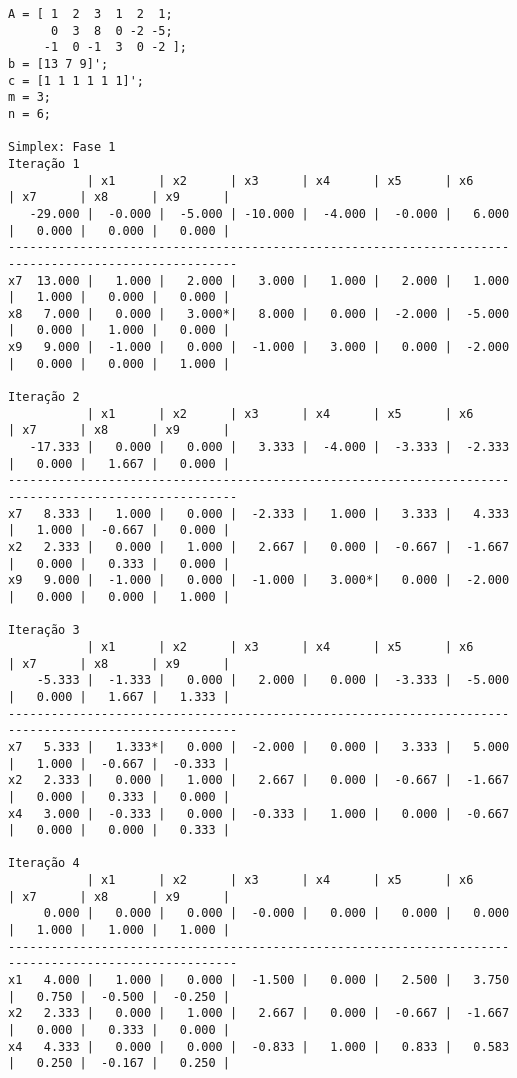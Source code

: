 \documentclass[brazil,times]{abnt}
\begin{document}
{\scriptsize \begin{verbatim}
A = [ 1  2  3  1  2  1;
      0  3  8  0 -2 -5;
     -1  0 -1  3  0 -2 ];
b = [13 7 9]';
c = [1 1 1 1 1 1]';
m = 3;
n = 6;

Simplex: Fase 1
Iteração 1
           | x1      | x2      | x3      | x4      | x5      | x6      | x7      | x8      | x9      |
   -29.000 |  -0.000 |  -5.000 | -10.000 |  -4.000 |  -0.000 |   6.000 |   0.000 |   0.000 |   0.000 |
------------------------------------------------------------------------------------------------------
x7  13.000 |   1.000 |   2.000 |   3.000 |   1.000 |   2.000 |   1.000 |   1.000 |   0.000 |   0.000 |
x8   7.000 |   0.000 |   3.000*|   8.000 |   0.000 |  -2.000 |  -5.000 |   0.000 |   1.000 |   0.000 |
x9   9.000 |  -1.000 |   0.000 |  -1.000 |   3.000 |   0.000 |  -2.000 |   0.000 |   0.000 |   1.000 |

Iteração 2
           | x1      | x2      | x3      | x4      | x5      | x6      | x7      | x8      | x9      |
   -17.333 |   0.000 |   0.000 |   3.333 |  -4.000 |  -3.333 |  -2.333 |   0.000 |   1.667 |   0.000 |
------------------------------------------------------------------------------------------------------
x7   8.333 |   1.000 |   0.000 |  -2.333 |   1.000 |   3.333 |   4.333 |   1.000 |  -0.667 |   0.000 |
x2   2.333 |   0.000 |   1.000 |   2.667 |   0.000 |  -0.667 |  -1.667 |   0.000 |   0.333 |   0.000 |
x9   9.000 |  -1.000 |   0.000 |  -1.000 |   3.000*|   0.000 |  -2.000 |   0.000 |   0.000 |   1.000 |

Iteração 3
           | x1      | x2      | x3      | x4      | x5      | x6      | x7      | x8      | x9      |
    -5.333 |  -1.333 |   0.000 |   2.000 |   0.000 |  -3.333 |  -5.000 |   0.000 |   1.667 |   1.333 |
------------------------------------------------------------------------------------------------------
x7   5.333 |   1.333*|   0.000 |  -2.000 |   0.000 |   3.333 |   5.000 |   1.000 |  -0.667 |  -0.333 |
x2   2.333 |   0.000 |   1.000 |   2.667 |   0.000 |  -0.667 |  -1.667 |   0.000 |   0.333 |   0.000 |
x4   3.000 |  -0.333 |   0.000 |  -0.333 |   1.000 |   0.000 |  -0.667 |   0.000 |   0.000 |   0.333 |

Iteração 4
           | x1      | x2      | x3      | x4      | x5      | x6      | x7      | x8      | x9      |
     0.000 |   0.000 |   0.000 |  -0.000 |   0.000 |   0.000 |   0.000 |   1.000 |   1.000 |   1.000 |
------------------------------------------------------------------------------------------------------
x1   4.000 |   1.000 |   0.000 |  -1.500 |   0.000 |   2.500 |   3.750 |   0.750 |  -0.500 |  -0.250 |
x2   2.333 |   0.000 |   1.000 |   2.667 |   0.000 |  -0.667 |  -1.667 |   0.000 |   0.333 |   0.000 |
x4   4.333 |   0.000 |   0.000 |  -0.833 |   1.000 |   0.833 |   0.583 |   0.250 |  -0.167 |   0.250 |


\end{verbatim}}
\end{document}
